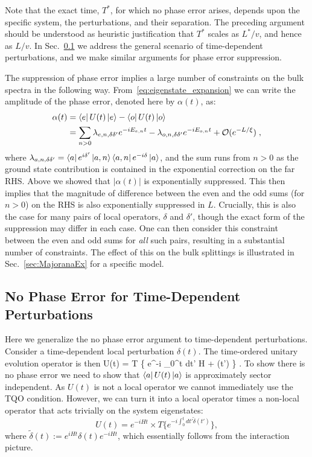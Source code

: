 \documentclass[aps,pra,floatfix,footinbib,longbibliography,twocolumn,superscriptaddress, preprintnumbers, nobibnotes]{revtex4-1}
\begin{document}
Note that the exact time, $T^*$, for which no phase error arises, depends upon the specific system, the perturbations, and their separation. The preceding argument should be understood as heuristic justification that $T^*$ scales as $L^*/v$, and hence as $L/v$. In Sec.~\ref{app:TimeDepPert} we address the general scenario of time-dependent perturbations, and we make similar arguments for phase error suppression.

The suppression of phase error implies a large number of constraints on the bulk spectra in the following way. From~\eqref{eq:eigenstate_expansion} we can write the amplitude of the phase error, denoted here by $\alpha(t)$, as:
\begin{align}\label{eq:spectral_diff_bound}
\alpha(t) & = \left\langle e\right| U(t) \left|e\right\rangle -  \left\langle o\right| U(t) \left|o\right\rangle 
\\
& = \sum_{n>0}  \lambda_{e,n,\delta \delta'}e^{-i E_{e,n} t} -  \lambda_{o,n,\delta \delta'} e^{-i E_{o,n} t} + \mathcal{O}(e^{-L / \xi })  \; \nonumber ,
\end{align}
where $\lambda_{a,n,\delta \delta'} = \left\langle a\right|e^{i \delta'}\left|a,n\right\rangle\left\langle a,n\right| e^{-i \delta}\left|a\right\rangle$, and the sum runs from $n>0$ as the ground state contribution is contained in the exponential correction on the far RHS. Above we showed that $| \alpha (t) |$ is exponentially suppressed. This then implies that the magnitude of difference between the even and the odd sums (for $n>0$) on the RHS is also exponentially suppressed in $L$. Crucially, this is also the case for many pairs of local operators, $\delta$ and $\delta'$, though the exact form of the suppression may differ in each case. One can then consider this constraint between the even and odd sums for \emph{all} such pairs, resulting in a substantial number of constraints. The effect of this on the bulk splittings is illustrated in Sec.~\ref{sec:MajoranaEx} for a specific model.

\subsection{No Phase Error for Time-Dependent Perturbations}\label{app:TimeDepPert}

Here we generalize the no phase error argument to time-dependent perturbations. Consider a time-dependent local perturbation $\delta(t)$. The time-ordered unitary evolution operator is then 
\be
U(t) = T \{ e^{-i \int_0^t dt' H + \delta(t') } \} \; .
\ee
To show there is no phase error we need to show that $\left\langle a\right|U(t)\left|a\right\rangle$ is approximately sector independent. As $U(t)$ is not a local operator we cannot immediately use the TQO condition. However, we can turn it into a local operator times a non-local operator that acts trivially on the system eigenstates:
\begin{equation}\label{eq:interaction_picture_unitary}
U(t) = e^{-i H t} \times T \{ e^{-i \int_0^t dt' \tilde{\delta}(t') } \},
\end{equation}
where $\tilde{\delta}(t):= e^{i H t}\delta(t)e^{-i H t}$, which essentially follows from the interaction picture.  
\end{document}
